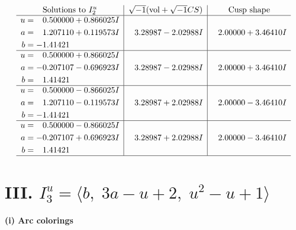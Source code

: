 \documentclass[1p]{elsarticle_modified}
\theoremstyle{definition}
\newcommand{\I}{\sqrt{-1}}
\begin{document}
$$\begin{array}{c|c|c}  
\text{Solutions to }I^u_{2}& \I (\text{vol} + \sqrt{-1}CS) & \text{Cusp shape}\\
 \hline 
\begin{aligned}
u &= \phantom{-}0.500000 + 0.866025 I \\
a &= \phantom{-}1.207110 + 0.119573 I \\
b &= -1.41421\phantom{ +0.000000I}\end{aligned}
 & \phantom{-}3.28987 - 2.02988 I & \phantom{-}2.00000 + 3.46410 I \\ \hline\begin{aligned}
u &= \phantom{-}0.500000 + 0.866025 I \\
a &= -0.207107 - 0.696923 I \\
b &= \phantom{-}1.41421\phantom{ +0.000000I}\end{aligned}
 & \phantom{-}3.28987 - 2.02988 I & \phantom{-}2.00000 + 3.46410 I \\ \hline\begin{aligned}
u &= \phantom{-}0.500000 - 0.866025 I \\
a &= \phantom{-}1.207110 - 0.119573 I \\
b &= -1.41421\phantom{ +0.000000I}\end{aligned}
 & \phantom{-}3.28987 + 2.02988 I & \phantom{-}2.00000 - 3.46410 I \\ \hline\begin{aligned}
u &= \phantom{-}0.500000 - 0.866025 I \\
a &= -0.207107 + 0.696923 I \\
b &= \phantom{-}1.41421\phantom{ +0.000000I}\end{aligned}
 & \phantom{-}3.28987 + 2.02988 I & \phantom{-}2.00000 - 3.46410 I\\
 \hline 
 \end{array}$$\newpage\newpage\renewcommand{\arraystretch}{1}
\centering \section*{III. $I^u_{3}= \langle b,\;3 a- u+2,\;u^2- u+1 \rangle$}
\flushleft \textbf{(i) Arc colorings}\\
\end{document}
